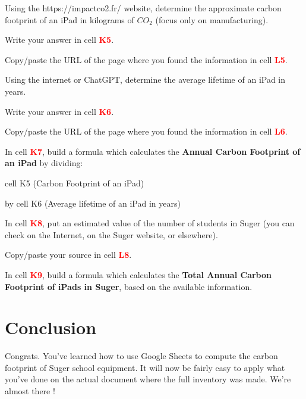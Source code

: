 \documentclass{exam}
\begin{document}
\begin{questions}
  \question Using the https://impactco2.fr/ website, determine the approximate carbon footprint of an iPad in kilograms of $CO_2$ (focus only on manufacturing).
  \begin{compactitem}
    \item Write your answer in cell \textbf{\textcolor{red}{K5}}.
    \item Copy/paste the URL of the page where you found the information in cell \textbf{\textcolor{red}{L5}}.
  \end{compactitem}

  \question Using the internet or ChatGPT, determine the average lifetime of an iPad in years.
  \begin{compactitem}
    \item Write your answer in cell \textbf{\textcolor{red}{K6}}.
    \item Copy/paste the URL of the page where you found the information in cell \textbf{\textcolor{red}{L6}}.
  \end{compactitem}

  \question In cell \textbf{\textcolor{red}{K7}}, build a formula which calculates the \textbf{Annual Carbon Footprint of an iPad} by dividing:
  \begin{compactitem}
    \item cell K5 (Carbon Footprint of an iPad)
    \item by cell K6 (Average lifetime of an iPad in years)
  \end{compactitem}

  \question In cell \textbf{\textcolor{red}{K8}}, put an estimated value of the number of students in Suger (you can check on the Internet, on the Suger website, or elsewhere).
  \begin{compactitem}
    \item Copy/paste your source in cell \textbf{\textcolor{red}{L8}}.
  \end{compactitem}

  \question In cell \textbf{\textcolor{red}{K9}}, build a formula which calculates the \textbf{Total Annual Carbon Footprint of iPads in Suger}, based on the available information.
\end{questions}

\section{Conclusion}

Congrats. You've learned how to use Google Sheets to compute the carbon footprint of Suger school equipment. It will now be fairly easy to apply what you've done on the actual document where the full inventory was made. We're almost there !
\end{document}
